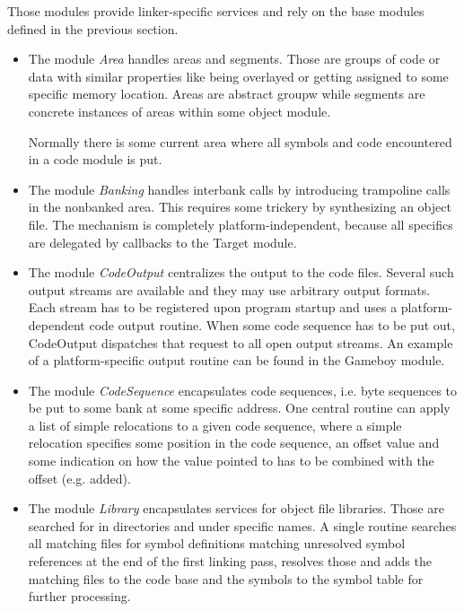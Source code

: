 \documentclass[10pt]{article}
\newcommand{\definition}[1]{\emph{#1}}
\begin{document}
Those modules provide linker-specific services and rely on the base
modules defined in the previous section.

\begin{itemize}

  \item The module \definition{Area} handles areas and segments.
        Those are groups of code or data with similar properties like
        being overlayed or getting assigned to some specific memory
        location.  Areas are abstract groupw while segments are
        concrete instances of areas within some object module.

        Normally there is some current area where all symbols and code
        encountered in a code module is put.

  \item The module \definition{Banking} handles interbank calls by
        introducing trampoline calls in the nonbanked area.  This
        requires some trickery by synthesizing an object file.  The
        mechanism is completely platform-independent, because all
        specifics are delegated by callbacks to the Target module.

  \item The module \definition{CodeOutput} centralizes the output to
        the code files.  Several such output streams are available and
        they may use arbitrary output formats.  Each stream has to be
        registered upon program startup and uses a platform-dependent
        code output routine.  When some code sequence has to be put
        out, CodeOutput dispatches that request to all open output
        streams.  An example of a platform-specific output routine can
        be found in the Gameboy module.

  \item The module \definition{CodeSequence} encapsulates code
        sequences, i.e. byte sequences to be put to some bank at some
        specific address.  One central routine can apply a list of
        simple relocations to a given code sequence, where a simple
        relocation specifies some position in the code sequence, an
        offset value and some indication on how the value pointed to
        has to be combined with the offset (e.g. added).

  \item The module \definition{Library} encapsulates services for
        object file libraries.  Those are searched for in directories
        and under specific names.  A single routine searches all
        matching files for symbol definitions matching unresolved
        symbol references at the end of the first linking pass,
        resolves those and adds the matching files to the code base
        and the symbols to the symbol table for further processing.


\end{itemize}
\end{document}
